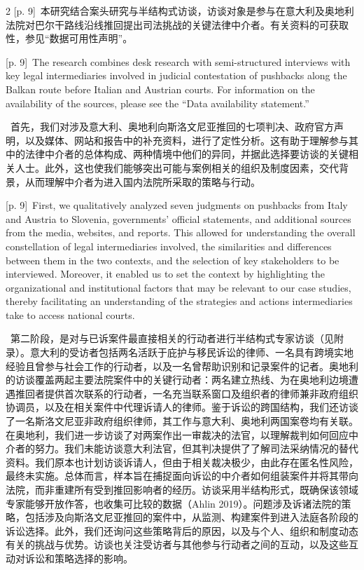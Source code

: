 \documentclass[10pt,a4paper]{article}
\begin{document}
\begin{paracol}{2}
{\scriptsize\color{gray} [p. 9]}\ 本研究结合案头研究与半结构式访谈，访谈对象是参与在意大利及奥地利法院对巴尔干路线沿线推回提出司法挑战的关键法律中介者。有关资料的可获取性，参见“数据可用性声明”。\par
\switchcolumn
{\scriptsize\color{gray} [p. 9]}\ The research combines desk research with semi-structured interviews with key legal intermediaries involved in judicial contestation of pushbacks along the Balkan route before Italian and Austrian courts. For information on the availability of the sources, please see the “Data availability statement.”\par
\switchcolumn*
{\scriptsize\color{gray} [p. 9]}\ 首先，我们对涉及意大利、奥地利向斯洛文尼亚推回的七项判决、政府官方声明，以及媒体、网站和报告中的补充资料，进行了定性分析。这有助于理解参与其中的法律中介者的总体构成、两种情境中他们的异同，并据此选择要访谈的关键相关人士。此外，这也使我们能够突出可能与案例相关的组织及制度因素，交代背景，从而理解中介者为进入国内法院所采取的策略与行动。\par
\switchcolumn
{\scriptsize\color{gray} [p. 9]}\ First, we qualitatively analyzed seven judgments on pushbacks from Italy and Austria to Slovenia, governments’ official statements, and additional sources from the media, websites, and reports. This allowed for understanding the overall constellation of legal intermediaries involved, the similarities and differences between them in the two contexts, and the selection of key stakeholders to be interviewed. Moreover, it enabled us to set the context by highlighting the organizational and institutional factors that may be relevant to our case studies, thereby facilitating an understanding of the strategies and actions intermediaries take to access national courts.\par
\switchcolumn*
{\scriptsize\color{gray} [p. 9]}\ 第二阶段，是对与已诉案件最直接相关的行动者进行半结构式专家访谈（见附录）。意大利的受访者包括两名活跃于庇护与移民诉讼的律师、一名具有跨境实地经验且曾参与社会工作的行动者，以及一名曾帮助识别和记录案件的记者。奥地利的访谈覆盖两起主要法院案件中的关键行动者：两名建立热线、为在奥地利边境遭遇推回者提供首次联系的行动者，一名充当联系窗口及组织者的律师兼非政府组织协调员，以及在相关案件中代理诉请人的律师。鉴于诉讼的跨国结构，我们还访谈了一名斯洛文尼亚非政府组织律师，其工作与意大利、奥地利两国案卷均有关联。在奥地利，我们进一步访谈了对两案作出一审裁决的法官，以理解裁判如何回应中介者的努力。我们未能访谈意大利法官，但其判决提供了了解司法采纳情况的替代资料。我们原本也计划访谈诉请人，但由于相关裁决极少，由此存在匿名性风险，最终未实施。总体而言，样本旨在捕捉面向诉讼的中介者如何组装案件并将其带向法院，而非重建所有受到推回影响者的经历。访谈采用半结构形式，既确保该领域专家能够开放作答，也收集可比较的数据（Ahlin 2019）。问题涉及诉诸法院的策略，包括涉及向斯洛文尼亚推回的案件中，从监测、构建案件到进入法庭各阶段的诉讼选择。此外，我们还询问这些策略背后的原因，以及与个人、组织和制度动态有关的挑战与优势。访谈也关注受访者与其他参与行动者之间的互动，以及这些互动对诉讼和策略选择的影响。\par

\end{paracol}
\end{document}
